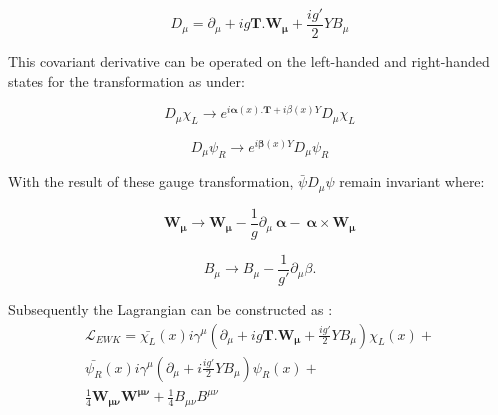 \begin{equation}
	D_{\mu} = \partial_{\mu}  + ig\mathbf{T.W_{\mu}} + \frac{ig'}{2} YB_{\mu}%
\label{eqn:cov_der}
\end{equation}

This covariant derivative can be operated on the left-handed and right-handed states for the transformation as under:

\begin{equation}
	D_{\mu}\chi_{L} \to e^{i \mathbf{\alpha}(x).\mathbf{T}+i \beta (x)Y} D_{\mu}\chi_{L} %
\label{eqn:act_left}
\end{equation}

\begin{equation}
        D_{\mu}\psi_{R} \to e^{i \mathbf{\beta}(x)Y} D_{\mu}\psi_{R} %
\label{eqn:act_right}
\end{equation}

With the result of these gauge transformation, $\bar{\psi}D_{\mu}\psi$ remain invariant where:

\begin{equation}
	\mathbf{W_{\mu}} \to \mathbf{W_{\mu}} - \frac{1}{g} \partial_{\mu} ~\mathbf{\alpha} - ~\mathbf{\alpha} \times \mathbf{W_{\mu}} %
\label{eqn:W_trans}
\end{equation}

\begin{equation}
	B_{\mu} \to B_{\mu} - \frac{1}{g'} \partial_{\mu} \beta. %
\label{eqn:B_trans}
\end{equation}

Subsequently the Lagrangian can be constructed as :
\begin{equation}
\begin{aligned}
	\mathscr{L}_{EWK}= \bar{\chi_{L}}(x)i\gamma^{\mu}(\partial_{\mu}  + ig\mathbf{T.W_{\mu}} + \frac{ig'}{2} YB_{\mu}) \chi_{L}(x) + \\
\bar{\psi_{R}}(x)i\gamma^{\mu}(\partial_{\mu}+i\frac{ig'}{2} YB_{\mu})\psi_{R}(x)+  \\
\frac{1}{4} \mathbf{W_{\mu\nu}}\mathbf{W^{\mu\nu}}+\frac{1}{4} B_{\mu\nu}B^{\mu\nu}
\label{eqn:ewk_lagrangian}
\end{aligned}
\end{equation}

